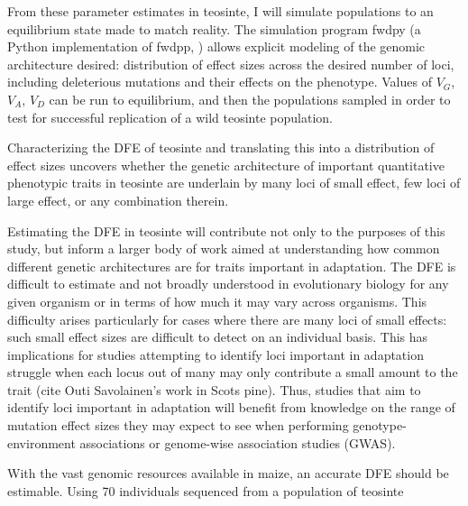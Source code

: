From these parameter estimates in teosinte, I will simulate populations to an equilibrium state made to match reality. The simulation program fwdpy (a Python implementation of fwdpp, \cite{Thornton:2014kn}) allows explicit modeling of the genomic architecture desired: distribution of effect sizes across the desired number of loci, including deleterious mutations and their effects on the phenotype. Values of $V_G$, $V_A$, $V_D$ can be run to equilibrium, and then the populations sampled in order to test for successful replication of a wild teosinte population.


Characterizing the DFE of teosinte and translating this into a distribution of effect sizes uncovers whether the genetic architecture of important quantitative phenotypic traits in teosinte are underlain by many loci of small effect, few loci of large effect, or any combination therein.

Estimating the DFE in teosinte will contribute not only to the purposes of this study, but inform a larger body of work aimed at understanding how common different genetic architectures are for traits important in adaptation. The DFE is difficult to estimate and not broadly understood in evolutionary biology for any given organism or in terms of how much it may vary across organisms. This difficulty arises particularly for cases where there are many loci of small effects: such small effect sizes are difficult to detect on an individual basis. This has implications for studies attempting to identify loci important in adaptation struggle when each locus out of many may only contribute a small amount to the trait (cite Outi Savolainen's work in Scots pine). Thus, studies that aim to identify loci important in adaptation will benefit from knowledge on the range of mutation effect sizes they may expect to see when performing genotype-environment associations or genome-wise association studies (GWAS). 


With the vast genomic resources available in maize, an accurate DFE should be estimable. Using 70 individuals sequenced from a population of teosinte 





